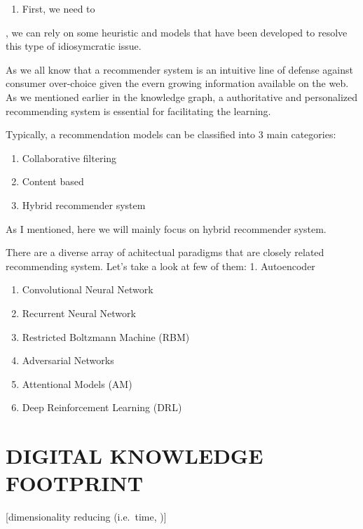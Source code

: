 \documentclass[]{book}
\providecommand{\tightlist}{%
  \setlength{\itemsep}{0pt}\setlength{\parskip}{0pt}}
\theoremstyle{definition}
\theoremstyle{definition}
\theoremstyle{definition}
\theoremstyle{remark}
\begin{document}
\begin{enumerate}
\def\labelenumi{\arabic{enumi}.}
\tightlist
\item
  First, we need to
\end{enumerate}

, we can rely on some heuristic and models that have been developed to
resolve this type of idiosymcratic issue.

As we all know that a recommender system is an intuitive line of defense
against consumer over-choice given the evern growing information
available on the web. As we mentioned earlier in the knowledge graph, a
authoritative and personalized recommending system is essential for
facilitating the learning.

Typically, a recommendation models can be classified into 3 main
categories:

\begin{enumerate}
\def\labelenumi{\arabic{enumi}.}
\item
  Collaborative filtering
\item
  Content based
\item
  Hybrid recommender system
\end{enumerate}

As I mentioned, here we will mainly focus on hybrid recommender system.

There are a diverse array of achitectual paradigms that are closely
related recommending system. Let's take a look at few of them: 1.
Autoencoder

\begin{enumerate}
\def\labelenumi{\arabic{enumi}.}
\setcounter{enumi}{1}
\item
  Convolutional Neural Network
\item
  Recurrent Neural Network
\item
  Restricted Boltzmann Machine (RBM)
\item
  Adversarial Networks
\item
  Attentional Models (AM)
\item
  Deep Reinforcement Learning (DRL)
\end{enumerate}

\chapter{DIGITAL KNOWLEDGE FOOTPRINT}\label{digital-knowledge-footprint}

{[}dimensionality reducing (i.e.~time, ){]}
\end{document}

